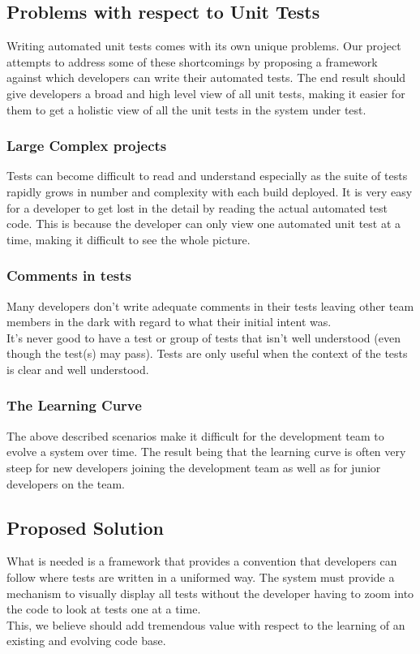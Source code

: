 \documentclass[a4paper,12pt]{Article}
\begin{document}
\subsection{Problems with respect to Unit Tests}
Writing automated unit tests comes with its own unique problems. Our project attempts to address some of these shortcomings by proposing a framework against which developers can write their automated tests. The end result should give developers a broad and high level view of all unit tests, making it easier for them to get a holistic view of all the unit tests in the system under test.
\subsubsection{Large Complex projects}
Tests can become difficult to read and understand especially as the suite of tests rapidly grows in number and complexity with each build deployed. It is very easy for a developer to get lost in the detail by reading the actual automated test code. This is because the developer can only view one automated unit test at a time, making it difficult to see the whole picture. 
\subsubsection{Comments in tests}
Many developers don't write adequate comments in their tests leaving other team members in the dark with regard to what their initial intent was.\\
\linebreak
It's never good to have a test or group of tests that isn't well understood (even though the test(s) may pass). Tests are only useful when the context of the tests is clear and well understood.  
\subsubsection{The Learning Curve}
The above described scenarios make it difficult for the development team to evolve a system over time. The result being that the learning curve is often very steep for new developers joining the development team as well as for junior developers on the team.
\subsection{Proposed Solution}
What is needed is a framework that provides a convention that developers can follow where tests are written in a uniformed way. The system must provide a mechanism to visually display all tests without the developer having to zoom into the code to look at tests one at a time.\\
\linebreak
This, we believe should add tremendous value with respect to the learning of an existing and evolving code base.
\end{document}
